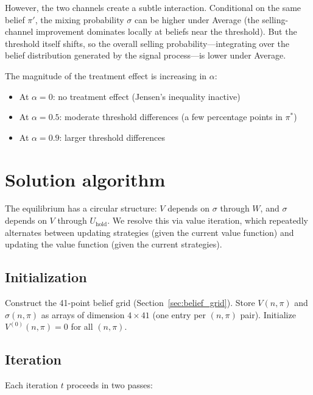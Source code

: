 \documentclass[11pt]{article}
\begin{document}
However, the two channels create a subtle interaction. Conditional on the
same belief $\pi'$, the mixing probability $\sigma$ can be higher under
Average (the selling-channel improvement dominates locally at beliefs near
the threshold). But the threshold itself shifts, so the overall selling
probability---integrating over the belief distribution generated by the
signal process---is lower under Average.

The magnitude of the treatment effect is increasing in $\alpha$:
\begin{itemize}
    \item At $\alpha = 0$: no treatment effect (Jensen's inequality inactive)
    \item At $\alpha = 0.5$: moderate threshold differences (a few percentage
          points in $\pi^*$)
    \item At $\alpha = 0.9$: larger threshold differences
\end{itemize}

\section{Solution algorithm}

The equilibrium has a circular structure: $V$ depends on $\sigma$ through
$W$, and $\sigma$ depends on $V$ through $U_{\text{hold}}$. We resolve this
via value iteration, which repeatedly alternates between updating strategies
(given the current value function) and updating the value function (given the
current strategies).

\subsection{Initialization}

Construct the 41-point belief grid (Section~\ref{sec:belief_grid}). Store
$V(n, \pi)$ and $\sigma(n, \pi)$ as arrays of dimension $4 \times 41$ (one
entry per $(n, \pi)$ pair). Initialize $V^{(0)}(n, \pi) = 0$ for all
$(n, \pi)$.

\subsection{Iteration}

Each iteration $t$ proceeds in two passes:
\end{document}
